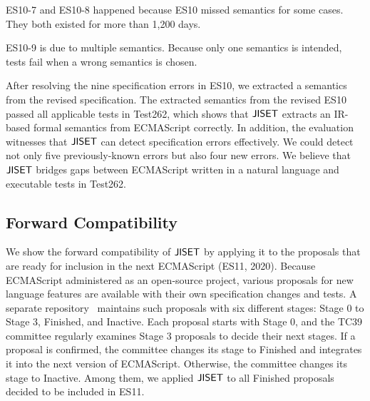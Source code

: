ES10-7 and ES10-8 happened because ES10 missed semantics for some
cases.  They both existed for more than 1,200 days.

ES10-9 is due to multiple semantics.  Because only one semantics is
intended,  tests fail when a wrong semantics is chosen.

After resolving the nine specification errors in ES10, we extracted a
semantics from the revised specification.  The extracted semantics
from the revised ES10 passed all  applicable tests in Test262,
which shows that \( \text{\sf JISET} \) extracts an IR-based formal semantics
from ECMAScript correctly.  In addition, the evaluation witnesses that
\( \text{\sf JISET} \) can detect specification errors effectively.
We could detect not only five previously-known errors
but also four new errors.  We believe that \( \text{\sf JISET} \) bridges gaps
between ECMAScript written in a natural language and executable tests
in Test262.

\subsection{Forward Compatibility}

We show the forward compatibility of \( \text{\sf JISET} \) by applying it to the proposals
that are ready for inclusion in the next ECMAScript (ES11, 2020). Because
ECMAScript administered as an open-source project, various proposals for new
language features are available with their own specification changes and tests.
A separate repository~\cite{proposals} maintains such proposals with six
different stages: Stage 0 to Stage 3, Finished, and Inactive.  Each proposal
starts with Stage 0, and the TC39 committee regularly examines Stage 3 proposals
to decide their next stages.  If a proposal is confirmed, the committee changes
its stage to Finished and integrates it into the next version of ECMAScript.
Otherwise, the committee changes its stage to Inactive.  Among them, we applied
\( \text{\sf JISET} \) to all Finished proposals decided to be included in ES11.

